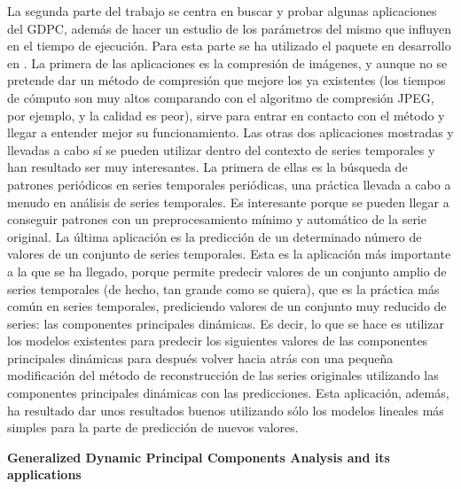 La segunda parte del trabajo se centra en buscar y probar algunas aplicaciones del GDPC, además de hacer un estudio de los parámetros del mismo que influyen en el tiempo de ejecución. Para esta parte se ha utilizado el paquete en desarrollo en \cite{ezeq}. La primera de las aplicaciones es la compresión de imágenes, y aunque no se pretende dar un método de compresión que mejore los ya existentes (los tiempos de cómputo son muy altos comparando con el algoritmo de compresión JPEG, por ejemplo, y la calidad es peor), sirve para entrar en contacto con el método y llegar a entender mejor su funcionamiento. Las otras dos aplicaciones mostradas y llevadas a cabo sí se pueden utilizar dentro del contexto de series temporales y han resultado ser muy interesantes. La primera de ellas es la búsqueda de patrones periódicos en series temporales periódicas, una práctica llevada a cabo a menudo en análisis de series temporales. Es interesante porque se pueden llegar a conseguir patrones con un preprocesamiento mínimo y automático de la serie original. La última aplicación es la predicción de un determinado número de valores de un conjunto de series temporales. Esta es la aplicación más importante a la que se ha llegado, porque permite predecir valores de un conjunto amplio de series temporales (de hecho, tan grande como se quiera), que es la práctica más común en series temporales, prediciendo valores de un conjunto muy reducido de series: las componentes principales dinámicas. Es decir, lo que se hace es utilizar los modelos existentes para predecir los siguientes valores de las componentes principales dinámicas para después volver hacia atrás con una pequeña modificación del método de reconstrucción de las series originales utilizando las componentes principales dinámicas con las predicciones. Esta aplicación, además, ha resultado dar unos resultados buenos utilizando sólo los modelos lineales más simples para la parte de predicción de nuevos valores.

\cleardoublepage


\thispagestyle{empty}


\begin{center}
{\large\bfseries Generalized Dynamic Principal Components Analysis and its applications}\\
\end{center}
\begin{center}
	\myName	\\
\end{center}

\\

